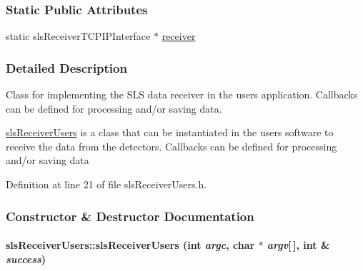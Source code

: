 \subsubsection*{Static Public Attributes}
\begin{CompactItemize}
\item 
static sls\-Receiver\-TCPIPInterface $\ast$ \hyperlink{classslsReceiverUsers_8f262724fb99ecd3976214710d82dd18}{receiver}
\end{CompactItemize}


\subsubsection{Detailed Description}
Class for implementing the SLS data receiver in the users application. Callbacks can be defined for processing and/or saving data. 

\hyperlink{classslsReceiverUsers}{sls\-Receiver\-Users} is a class that can be instantiated in the users software to receive the data from the detectors. Callbacks can be defined for processing and/or saving data 



Definition at line 21 of file sls\-Receiver\-Users.h.

\subsubsection{Constructor \& Destructor Documentation}
\hypertarget{classslsReceiverUsers_79a82ba94fbb19761c7701aa3901b8b1}{
\paragraph[slsReceiverUsers]{\setlength{\rightskip}{0pt plus 5cm}sls\-Receiver\-Users::sls\-Receiver\-Users (int {\em argc}, char $\ast$ {\em argv}\mbox{[}$\,$\mbox{]}, int \& {\em success})}\hfill}
\label{classslsReceiverUsers_79a82ba94fbb19761c7701aa3901b8b1}


